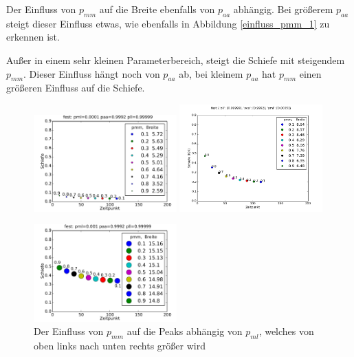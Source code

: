 Der Einfluss von $p_{mm}$ auf die Breite ebenfalls von $p_{aa}$ abhängig. Bei größerem $p_{aa}$ steigt dieser Einfluss etwas, wie ebenfalls in Abbildung \ref{einfluss_pmm_1} zu erkennen ist.


Außer in einem sehr kleinen Parameterbereich, steigt die Schiefe mit steigendem $p_{mm}$. Dieser Einfluss hängt noch von $p_{aa}$ ab, bei kleinem $p_{aa}$ hat $p_{mm}$ einen größeren Einfluss auf die Schiefe.

\begin{figure}
\includegraphics[width=0.49\textwidth]{bilder/pmm/3fest_p_00001_09992_099999}
\includegraphics[width=0.49\textwidth]{bilder/pmm/3fest_p_00005_09992_099999}

\includegraphics[width=0.49\textwidth]{bilder/pmm/3fest_p_0001_09992_099999}
\caption[Der Einfluss von $p_{mm}$ auf die Peaks abhängig von $p_{ml}$]{Der Einfluss von $p_{mm}$ auf die Peaks abhängig von $p_{ml}$, welches von oben links nach unten rechts größer wird}
\label{einfluss_pmm_2}
\end{figure}

